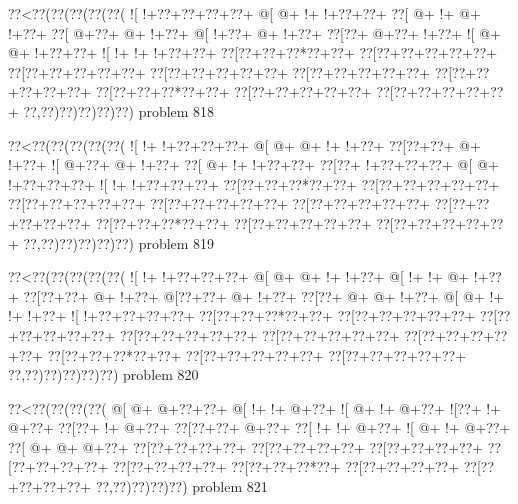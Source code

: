 \vbox{\vbox{\goo
\0??<\0??(\0??(\0??(\0??(\0??(
\- ![\- !+\0??+\0??+\0??+\0??+
\- @[\- @+\- !+\- !+\0??+\0??+
\0??[\- @+\- !+\- @+\- !+\0??+
\0??[\- @+\0??+\- @+\- !+\0??+
\- @[\- !+\0??+\- @+\- !+\0??+
\0??[\0??+\- @+\0??+\- !+\0??+
\- ![\- @+\- @+\- !+\0??+\0??+
\- ![\- !+\- !+\- !+\0??+\0??+
\0??[\0??+\0??+\0??*\0??+\0??+
\0??[\0??+\0??+\0??+\0??+\0??+
\0??[\0??+\0??+\0??+\0??+\0??+
\0??[\0??+\0??+\0??+\0??+\0??+
\0??[\0??+\0??+\0??+\0??+\0??+
\0??[\0??+\0??+\0??+\0??+\0??+
\0??[\0??+\0??+\0??*\0??+\0??+
\0??[\0??+\0??+\0??+\0??+\0??+
\0??[\0??+\0??+\0??+\0??+\0??+
\0??,\0??)\0??)\0??)\0??)\0??)
}
\hfil problem 818\hfil\break
}

\vbox{\vbox{\goo
\0??<\0??(\0??(\0??(\0??(\0??(
\- ![\- !+\- !+\0??+\0??+\0??+
\- @[\- @+\- @+\- !+\- !+\0??+
\0??[\0??+\0??+\- @+\- !+\0??+
\- ![\- @+\0??+\- @+\- !+\0??+
\0??[\- @+\- !+\- !+\0??+\0??+
\0??[\0??+\- !+\0??+\0??+\0??+
\- @[\- @+\- !+\0??+\0??+\0??+
\- ![\- !+\- !+\0??+\0??+\0??+
\0??[\0??+\0??+\0??*\0??+\0??+
\0??[\0??+\0??+\0??+\0??+\0??+
\0??[\0??+\0??+\0??+\0??+\0??+
\0??[\0??+\0??+\0??+\0??+\0??+
\0??[\0??+\0??+\0??+\0??+\0??+
\0??[\0??+\0??+\0??+\0??+\0??+
\0??[\0??+\0??+\0??*\0??+\0??+
\0??[\0??+\0??+\0??+\0??+\0??+
\0??[\0??+\0??+\0??+\0??+\0??+
\0??,\0??)\0??)\0??)\0??)\0??)
}
\hfil problem 819\hfil\break
}

\vbox{\vbox{\goo
\0??<\0??(\0??(\0??(\0??(\0??(
\- ![\- !+\- !+\0??+\0??+\0??+
\- @[\- @+\- @+\- !+\- !+\0??+
\- @[\- !+\- !+\- @+\- !+\0??+
\0??[\0??+\0??+\- @+\- !+\0??+
\- @[\0??+\0??+\- @+\- !+\0??+
\0??[\0??+\- @+\- @+\- !+\0??+
\- @[\- @+\- !+\- !+\- !+\0??+
\- ![\- !+\0??+\0??+\0??+\0??+
\0??[\0??+\0??+\0??*\0??+\0??+
\0??[\0??+\0??+\0??+\0??+\0??+
\0??[\0??+\0??+\0??+\0??+\0??+
\0??[\0??+\0??+\0??+\0??+\0??+
\0??[\0??+\0??+\0??+\0??+\0??+
\0??[\0??+\0??+\0??+\0??+\0??+
\0??[\0??+\0??+\0??*\0??+\0??+
\0??[\0??+\0??+\0??+\0??+\0??+
\0??[\0??+\0??+\0??+\0??+\0??+
\0??,\0??)\0??)\0??)\0??)\0??)
}
\hfil problem 820\hfil\break
}

\vbox{\vbox{\goo
\0??<\0??(\0??(\0??(\0??(
\- @[\- @+\- @+\0??+\0??+
\- @[\- !+\- !+\- @+\0??+
\- ![\- @+\- !+\- @+\0??+
\- ![\0??+\- !+\- @+\0??+
\0??[\0??+\- !+\- @+\0??+
\0??[\0??+\0??+\- @+\0??+
\0??[\- !+\- !+\- @+\0??+
\- ![\- @+\- !+\- @+\0??+
\0??[\- @+\- @+\- @+\0??+
\0??[\0??+\0??+\0??+\0??+
\0??[\0??+\0??+\0??+\0??+
\0??[\0??+\0??+\0??+\0??+
\0??[\0??+\0??+\0??+\0??+
\0??[\0??+\0??+\0??+\0??+
\0??[\0??+\0??+\0??*\0??+
\0??[\0??+\0??+\0??+\0??+
\0??[\0??+\0??+\0??+\0??+
\0??,\0??)\0??)\0??)\0??)
}
\hfil problem 821\hfil\break
}

